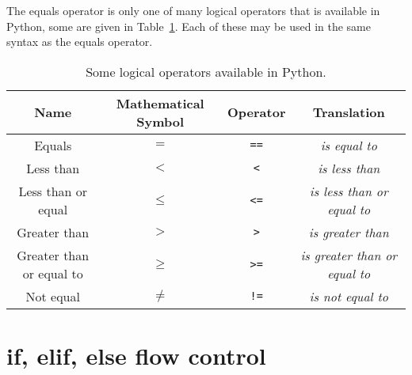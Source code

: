 \documentclass[a4paper]{article}
\begin{document}
The equals operator is only one of many logical operators that is available in Python, some are given in Table~\ref{tab:ops}.
Each of these may be used in the same syntax as the equals operator.
\begin{table}[h]
	\centering
	\caption{Some logical operators available in Python.}
	\label{tab:ops}
	\begin{tabular}{c c c c}
		\hline
		Name & Mathematical Symbol & Operator & Translation \\
		\hline
		Equals & $=$ &\texttt{==} & \emph{is equal to} \\
		Less than & $<$ & \texttt{<} & \emph{is less than} \\
		Less than or equal & $\leq$ & \texttt{<=} & \emph{is less than or equal to} \\
		Greater than & $>$ & \texttt{>} & \emph{is greater than} \\
		Greater than or equal to & $\geq$ & \texttt{>=} & \emph{is greater than or equal to} \\
		Not equal & $\neq$ & \texttt{!=} & \emph{is not equal to} \\
		\hline
	\end{tabular}
\end{table}
\vspace{\baselineskip}
\begin{center}
	\noindent{}
\end{center}

\section{if, elif, else flow control}
\end{document}
